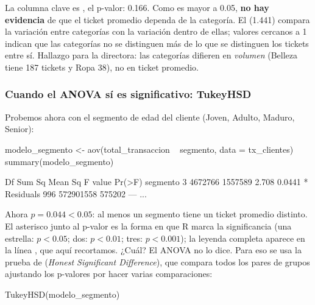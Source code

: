 La columna clave es , el p-valor: 0.166. Como es mayor a
0.05, \textbf{no hay evidencia} de que el ticket promedio dependa de la
categoría. El  (1.441) compara la variación entre categorías
con la variación dentro de ellas; valores cercanos a 1 indican que las
categorías no se distinguen más de lo que se distinguen los tickets entre
sí. Hallazgo para la directora: las categorías difieren en \emph{volumen}
(Belleza tiene 187 tickets y Ropa 38), no en ticket promedio.

\subsubsection{Cuando el ANOVA sí es significativo: TukeyHSD}

Probemos ahora con el segmento de edad del cliente (Joven, Adulto, Maduro,
Senior):

\begin{rcode}
modelo_segmento <- aov(total_transaccion ~ segmento, data = tx_clientes)
summary(modelo_segmento)
\end{rcode}
\begin{rsalida}
             Df    Sum Sq Mean Sq F value Pr(>F)
segmento      3   4672766 1557589   2.708 0.0441 *
Residuals   996 572901558  575202
---
...
\end{rsalida}

Ahora $p = 0.044 < 0.05$: al menos un segmento tiene un ticket promedio
distinto. El asterisco junto al p-valor es la forma en que R marca la
significancia (una estrella: $p < 0.05$; dos: $p < 0.01$; tres:
$p < 0.001$); la leyenda completa aparece en la línea
, que aquí recortamos. ¿Cuál? El ANOVA no lo dice. Para eso se usa la prueba de
 (\emph{Honest Significant Difference}), que compara
todos los pares de grupos ajustando los p-valores por hacer varias
comparaciones:

\begin{rcode}
TukeyHSD(modelo_segmento)
\end{rcode}

